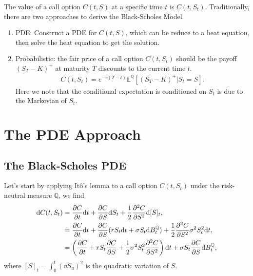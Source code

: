 \documentclass{book}
\begin{document}
The value of a call option $C(t,S)$ at a specific time $t$ is $C(t, S_t)$. Traditionally, there are two approaches to derive the Black-Scholes Model.
\begin{enumerate}
    \item PDE: Construct a PDE for $C(t,S)$, which can be reduce to a heat equation, then solve the heat equation to get the solution.
    \item Probabilistic: the fair price of a call option $C(t, S_t)$ should be the payoff $(S_T-K)^+$ at maturity $T$ discounts to the current time $t$.
    \begin{align}
        C(t, S_t) = e^{-r (T-t)} \mathbb{E}^{\mathbb{Q}}[(S_T-K)^+ | S_t = S].
        \label{eqn:BSM:call-as-expect}
    \end{align}
    Here we note that the conditional expectation is conditioned on $S_t$ is due to the Markovian of $S_t$.
\end{enumerate}

\section{The PDE Approach}

\subsection{The Black-Scholes PDE}

Let's start by applying Itô’s lemma to a call option $C(t, S_t)$ under the risk-neutral measure $\mathbb{Q}$, we find
\begin{align}
    \dd C(t, S_t) &= \pdv{C}{t} \dd t + \pdv{C}{S} \dd S_t + \frac{1}{2}{\pdv[2]{C}{S}}{\dd} [S]_t, \notag\\
    &= \pdv{C}{t} \dd t + {\pdv{C}{S}} (rS_t \dd t+\sigma S_t \dd B_t^\mathbb{Q}) + \frac{1}{2}{\pdv[2]{C}{S}}\sigma^2 S_t^2 \dd t, \notag\\
    &= \left(\pdv{C}{t} + rS_t {\pdv{C}{S}} + \frac{1}{2} \sigma^2 S_t^2 {\pdv[2]{C}{S}} \right) \dd t + \sigma S_t {\pdv{C}{S}} \dd B_t^\mathbb{Q},
\end{align}
where $[S]_t = \int_0^t (\dd S_u)^2$ is the quadratic variation of $S$. 
\end{document}

